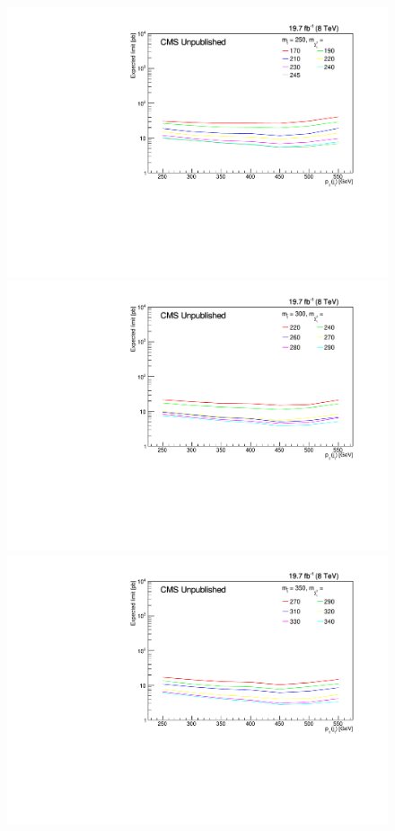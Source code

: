 \begin{figure}[!Ht]
\begin{center}
  \includegraphics[scale=0.35]{Figures/sus13009/limitplots/plots/stop/expected_250.pdf}
  \includegraphics[scale=0.35]{Figures/sus13009/limitplots/plots/stop/expected_300.pdf} 
  \includegraphics[scale=0.35]{Figures/sus13009/limitplots/plots/stop/expected_350.pdf}  

\end{center}
\end{figure}

